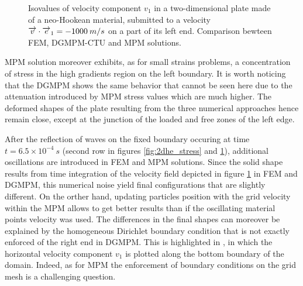 \begin{figure}[h!]
  \centering
  
  \caption{Isovalues of velocity component $v_1$ in a two-dimensional plate made of a neo-Hookean material, submitted to a velocity ${\overrightarrow{v}}\cdot{\overrightarrow{e}}_1=-1000 \: m/s$ on a part of its left end. Comparison bewteen FEM, DGMPM-CTU and MPM solutions.}
  \label{fig:2dhe_velo}
\end{figure}
MPM solution moreover exhibits, as for small strains problems, a concentration of stress in the high gradients region on the left boundary. It is worth noticing that the DGMPM shows the same behavior that cannot be seen here due to the attenuation introduced by MPM stress values which are much higher.
The deformed shapes of the plate resulting from the three numerical approaches hence remain close, except at the junction of the loaded and free zones of the left edge.

After the reflection of waves on the fixed boundary occuring at time $t=6.5\times 10^{-4}\:s$ (second row in figures \ref{fig:2dhe_stress} and \ref{fig:2dhe_velo}), additional oscillations are introduced in FEM and MPM solutions. 
Since the solid shape results from time integration of the velocity field depicted in figure \ref{fig:2dhe_velo} in FEM and DGMPM, this numerical noise yield final configurations that are slightly different. On the orther hand, updating particles position with the grid velocity within the MPM allows to get better results than if the oscillating material points velocity was used.
The differences in the final shapes can moreover be explained by the homogeneous Dirichlet boundary condition that is not exactly enforced of the right end in DGMPM. This is highlighted in \cite{DGMPM}, in which the horizontal velocity component $v_1$ is plotted along the bottom boundary of the domain. Indeed, as for MPM \cite{BC_MPM} the enforcement of boundary conditions on the grid mesh is a challenging question.



